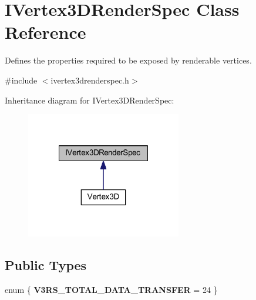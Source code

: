 \hypertarget{class_i_vertex3_d_render_spec}{\section{I\-Vertex3\-D\-Render\-Spec Class Reference}
\label{class_i_vertex3_d_render_spec}
}


Defines the properties required to be exposed by renderable vertices.  




{\ttfamily \#include $<$ivertex3drenderspec.\-h$>$}



Inheritance diagram for I\-Vertex3\-D\-Render\-Spec\-:\nopagebreak
\begin{figure}[H]
\begin{center}
\leavevmode
\includegraphics[width=192pt]{class_i_vertex3_d_render_spec__inherit__graph}
\end{center}
\end{figure}
\subsection*{Public Types}
\begin{DoxyCompactItemize}
\item 
enum \{ {\bfseries V3\-R\-S\-\_\-\-T\-O\-T\-A\-L\-\_\-\-D\-A\-T\-A\-\_\-\-T\-R\-A\-N\-S\-F\-E\-R} = 24
 \}
\end{DoxyCompactItemize}
